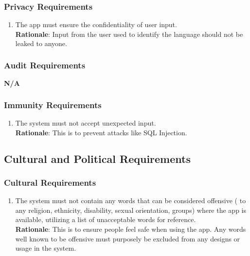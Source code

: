 \subsubsection{Privacy Requirements}
\label{ssub:privacy_requirements}
\begin{enumerate}[{SR-P}1. ]
	\item The app must ensure the confidentiality of user input. 
	\\ \textbf{Rationale}: Input from the user used to identify the language should not be leaked to anyone.
\end{enumerate}

\subsubsection{Audit Requirements}
\label{ssub:audit_requirements}
\textbf{N/A}

\subsubsection{Immunity Requirements}
\label{ssub:immunity_requirements}
\begin{enumerate}[{SR-IM}1. ]
	\item The system must not accept unexpected input.
	\\ \textbf{Rationale}: This is to prevent attacks like SQL Injection.
\end{enumerate}


\subsection{Cultural and Political Requirements}
\label{sub:cultural_and_political_requirements}

\subsubsection{Cultural Requirements}
\label{ssub:cultural_requirements}
\begin{enumerate}[{CP-C}1. ]
	\item The system must not contain any words that can be considered offensive ( to any religion, ethnicity, disability, sexual orientation, groups) where the app is available, utilizing a list of unacceptable words for reference.
	\\ \textbf{Rationale}: This is to ensure people feel safe when using the app.  Any words well known to be offensive must purposely be 	excluded from any designs or usage in the system. 
\end{enumerate}

